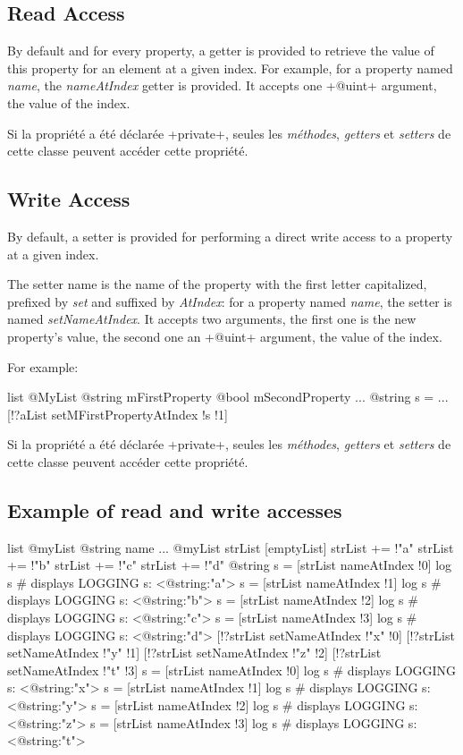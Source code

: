 \subsection{Read Access}

By default and for every property, a getter is provided to retrieve the value of this property for an element at a given index. For example, for a property named \emph{name}, the \emph{nameAtIndex} getter is provided. It accepts one \ggs+@uint+ argument, the value of the index.

Si la propriété a été déclarée \ggs+private+, seules les \emph{méthodes}, \emph{getters} et \emph{setters} de cette classe peuvent accéder cette propriété.



\subsection{Write Access}

By default, a setter is provided for performing a direct write access to a property at a given index.

The setter name is the name of the property with the first letter capitalized, prefixed by \emph{set} and suffixed by \emph{AtIndex}: for a property named \emph{name}, the setter is named \emph{setNameAtIndex}. It accepts two arguments, the first one is the new property's value, the second one an \ggs+@uint+ argument, the value of the index.

For example:

\begin{galgas}
list @MyList {
  @string mFirstProperty
  @bool mSecondProperty
}
...
@string s = ...
[!?aList setMFirstPropertyAtIndex !s !1]
\end{galgas}

Si la propriété a été déclarée \ggs+private+, seules les \emph{méthodes}, \emph{getters} et \emph{setters} de cette classe peuvent accéder cette propriété.


\subsection{Example of read and write accesses}

\begin{galgas}
list @myList {
  @string name
}
...
@myList strList [emptyList]
strList += !"a"
strList += !"b"
strList += !"c"
strList += !"d"
@string s = [strList nameAtIndex !0]
log s # displays LOGGING s: <@string:"a">
s = [strList nameAtIndex !1]
log s # displays LOGGING s: <@string:"b">
s = [strList nameAtIndex !2]
log s # displays LOGGING s: <@string:"c">
s = [strList nameAtIndex !3]
log s # displays LOGGING s: <@string:"d">
[!?strList setNameAtIndex !"x" !0]
[!?strList setNameAtIndex !"y" !1]
[!?strList setNameAtIndex !"z" !2]
[!?strList setNameAtIndex !"t" !3]
s = [strList nameAtIndex !0]
log s # displays LOGGING s: <@string:"x">
s = [strList nameAtIndex !1]
log s # displays LOGGING s: <@string:"y">
s = [strList nameAtIndex !2]
log s # displays LOGGING s: <@string:"z">
s = [strList nameAtIndex !3]
log s # displays LOGGING s: <@string:"t">
\end{galgas}



